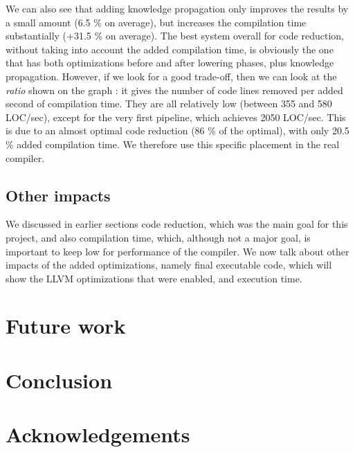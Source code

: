 \documentclass[11pt,a4paper]{article}
\newcommand{\perf}[1]{#1 \%}
\begin{document}
We can also see that adding knowledge propagation only improves the results by a small amount (\perf{6.5} on average), but increases the compilation time substantially (\perf{+31.5} on average). The best system overall for code reduction, without taking into account the added compilation time, is obviously the one that has both optimizations before and after lowering phases, plus knowledge propagation. However, if we look for a good trade-off, then we can look at the \textit{ratio} shown on the graph : it gives the number of code lines removed per added second of compilation time. They are all relatively low (between 355 and 580 LOC/sec), except for the very first pipeline, which achieves 2050 LOC/sec. This is due to an almost optimal code reduction (\perf{86} of the optimal), with only \perf{20.5} added compilation time. We therefore use this specific placement in the real compiler.

\subsection{Other impacts}

We discussed in earlier sections code reduction, which was the main goal for this project, and also compilation time, which, although not a major goal, is important to keep low for performance of the compiler. We now talk about other impacts of the added optimizations, namely final executable code, which will show the LLVM optimizations that were enabled, and execution time.





\section{Future work}


\section{Conclusion}

\section*{Acknowledgements}
\end{document}
